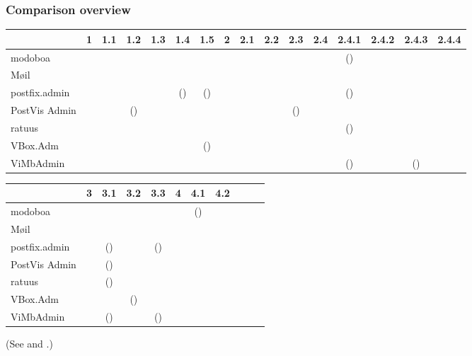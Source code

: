 \documentclass[12pt,a4paper]{scrartcl}
\begin{document}
			\begin{landscape}
				\subsubsection*{Comparison overview}
				\label{sec:evaluation:overview}
					\begin{tabular}{l|cccccc|ccccccccc}
						              & 1 & 1.1 & 1.2  & 1.3 & 1.4   & 1.5  & 2 & 2.1 & 2.2 & 2.3  & 2.4 & 2.4.1 & 2.4.2 & 2.4.3 & 2.4.4 \\
						\hline
						modoboa       &   & \y  &  \n  & \y  &  \y   &  \y  &   & \y  & \y  &  \y  &     & (\y)  & \y    &  \y   & \y    \\
						Møil          &   & \y  &  \n  & \y  &  \y   &  \y  &   & \y  & \y  &  \y  &     &  \y   & \n    &  \n   & \n    \\
						postfix.admin &   & \n  &      &     & (\y)  & (\y) &   & \y  & \y  &  \y  &     & (\y)  & \y    &  \n   & \n    \\
						PostVis Admin &   & \n  & (\y) & \n  &  \n   &  \n  &   & \y  & \n  & (\y) &     &  \n   & \n    &  \n   & \y    \\
						ratuus        &   & \n  &  \y  & \y  &  \n   &  \n  &   & \y  & \y  &  \y  &     & (\y)  & \n    &  \n   & \n    \\
						VBox.Adm      &   & \y  &  \n  & \y  &  \n   & (\y) &   & \y  & \y  &  \y  &     &  \n   & \y    &  \n   & \y    \\
						ViMbAdmin     &   & \y  &  \n  & \n  &  \n   &  \y  &   & \y  & \y  &  \y  &     & (\y)  & \n    & (\n)  & \n    \\
						\hline
					\end{tabular}
					\s

					\noindent
					\begin{tabular}{l|cccc|ccc|ccc}
						              & 3 & 3.1  & 3.2  & 3.3  & 4 & 4.1  & 4.2 \\
						\hline
						modoboa       &   &  \y  &  \y  &  \y  &   & (\y) & \y  \\
						Møil          &   &  \y  &  \y  &  \y  &   &  \y  & \y  \\
						postfix.admin &   & (\y) &  \n  & (\y) &   &  \n  & \y  \\
						PostVis Admin &   & (\y) &  \n  &  \n  &   &  \n  & \n  \\
						ratuus        &   & (\y) &  \n  &  \y  &   &  \n  & \n  \\
						VBox.Adm      &   &  \y  & (\y) &  \y  &   &  \n  & \y  \\
						ViMbAdmin     &   & (\y) &  \n  & (\n) &   &  \n  & \n  \\
						\hline
					\end{tabular}
					\s

					(See  and
					.)
			\end{landscape}
\end{document}
